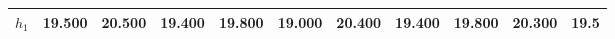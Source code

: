 
        \begin{tabular}{c|*{10}{c}}
            \hline
            \hline
                \(h_{1}\) & 19.500 & 20.500 & 19.400 & 19.800 & 19.000 & 20.400 & 19.400 & 19.800 & 20.300 & 19.5 \\
            \hline
            
            \hline
            \hline
        \end{tabular}
        